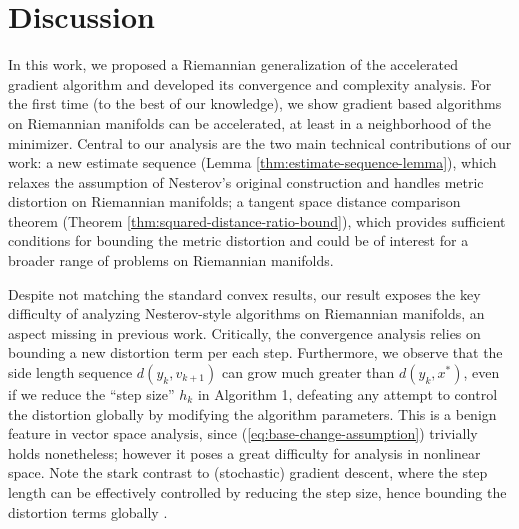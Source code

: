 \section{Discussion}
In this work, we proposed a Riemannian generalization of the accelerated gradient algorithm and developed its convergence and complexity analysis. For the first time (to the best of our knowledge), we show gradient based algorithms on Riemannian manifolds can be accelerated, at least in a neighborhood of the minimizer. Central to our analysis are the two main technical contributions of our work: a new estimate sequence (Lemma \ref{thm:estimate-sequence-lemma}), which relaxes the assumption of Nesterov's original construction and handles metric distortion on Riemannian manifolds; a tangent space distance comparison theorem (Theorem \ref{thm:squared-distance-ratio-bound}), which provides sufficient conditions for bounding the metric distortion and could be of interest for a broader range of problems on Riemannian manifolds.

Despite not matching the standard convex results, our result exposes the key difficulty of analyzing Nesterov-style algorithms on Riemannian manifolds, an aspect missing in previous work. Critically, the convergence analysis relies on bounding a new distortion term per each step. Furthermore, we observe that the side length sequence $d(y_k, v_{k+1})$ can grow much greater than $d(y_k, x^*)$, even if we reduce the ``step size'' $h_k$ in Algorithm 1, defeating any attempt to control the distortion globally by modifying the algorithm parameters. This is a benign feature in vector space analysis, since (\ref{eq:base-change-assumption}) trivially holds nonetheless; however it poses a great difficulty for analysis in nonlinear space. Note the stark contrast to (stochastic) gradient descent, where the step length can be effectively controlled by reducing the step size, hence bounding the distortion terms globally \citep{zhang2016first}.


